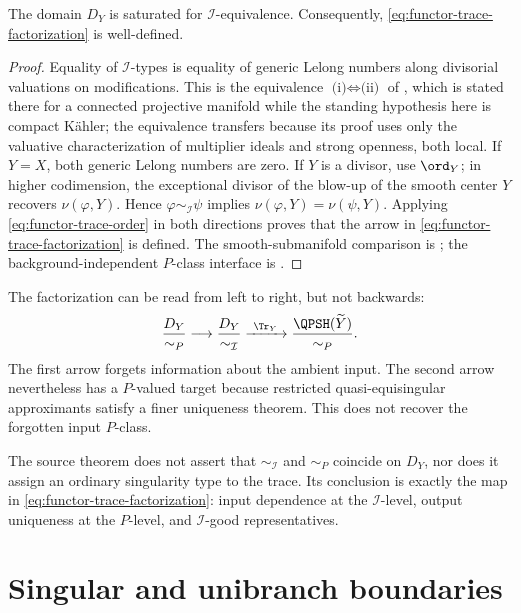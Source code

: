 \begin{proposition}\label{prop:functor-domain-saturation}
The domain $D_Y$ is saturated for $\mathcal I$-equivalence.
Consequently,
\eqref{eq:functor-trace-factorization} is well-defined.
\end{proposition}

\begin{proof}
Equality of $\mathcal I$-types is equality of generic Lelong numbers
along divisorial valuations on modifications.  This is the equivalence
$\text{(i)}\Leftrightarrow\text{(ii)}$ of
, which is stated there for a connected
projective manifold while the standing hypothesis here is compact
K\"ahler; the equivalence transfers because its proof uses only the
valuative characterization of multiplier ideals and strong openness, both
local. If $Y=X$, both generic Lelong numbers are zero. If $Y$ is a divisor,
use $\ord_Y$; in higher codimension, the exceptional divisor of the
blow-up of the smooth center $Y$ recovers $\nu(\varphi,Y)$. Hence
$\varphi\sim_{\mathcal I}\psi$ implies
$\nu(\varphi,Y)=\nu(\psi,Y)$. Applying
\eqref{eq:functor-trace-order} in both directions proves that the
arrow in \eqref{eq:functor-trace-factorization} is defined. The smooth-submanifold comparison is
\cite[Lemma~3.9]{DXTraceV2}; the background-independent $P$-class
interface is \cite[Propositions~8.1.1--8.1.2 and~8.2.1]{XiaBook}.
\end{proof}

The factorization can be read from left to right, but not backwards:
\[
 \frac{D_Y}{\sim_P}
 \longrightarrow
 \frac{D_Y}{\sim_{\mathcal I}}
 \xrightarrow{\ \Tr_Y\ }
 \frac{\QPSH(\widetilde Y)}{\sim_P}.
\]
The first arrow forgets information about the ambient input.  The second
arrow nevertheless has a $P$-valued target because restricted
quasi-equisingular approximants satisfy a finer uniqueness theorem.  This
does not recover the forgotten input $P$-class.

\begin{remark}
\label{rem:functor-not-p-sensitive}
The source theorem does not assert that $\sim_{\mathcal I}$ and $\sim_P$
coincide on $D_Y$, nor does it assign an ordinary singularity type to the
trace.  Its conclusion is exactly the map in
\eqref{eq:functor-trace-factorization}: input dependence at the
$\mathcal I$-level, output uniqueness at the $P$-level, and
$\mathcal I$-good representatives.
\end{remark}

\section{Singular and unibranch boundaries}
\label{sec:functor-singular-boundary}

